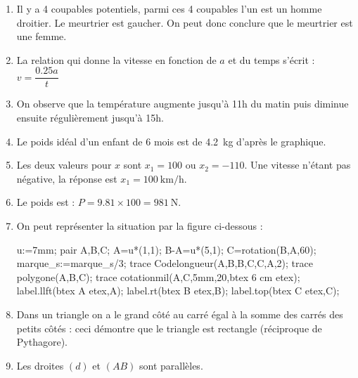 \documentclass[12pt,a4paper,oneside,dvipsnames,table,svgnames,skins,theorems]{report}
\begin{document}
\begin{enumerate}
\item Il y a 4 coupables potentiels, parmi ces 4 coupables l'un est un homme droitier. Le meurtrier est gaucher. On peut donc conclure que le meurtrier est une femme.
\item La relation qui donne la vitesse en fonction de $a$ et du temps s'écrit  : $v=\dfrac{0.25a}{t}$
\item On observe que la température augmente jusqu'à 11h du matin puis diminue ensuite régulièrement jusqu'à 15h.
\item Le poids idéal d'un enfant de 6 mois est de \SI{4.2}{\kilo\gram} d'après le graphique.
\item Les deux valeurs pour $x$ sont $x_1=100$ ou $x_2=-110$. Une vitesse n'étant pas négative, la réponse est $x_1=\SI{100}{\kilo\meter\per\hour}$.
\item Le poids est : $P=9.81 \times 100 = \SI{981}{\newton}$.
\item On peut représenter la situation par la figure ci-dessous : 
\begin{center}
\begin{Geometrie}[TypeTrace="MainLevee"]
u:=7mm;
pair A,B,C;
A=u*(1,1);
B-A=u*(5,1);
C=rotation(B,A,60);
marque_s:=marque_s/3;
trace Codelongueur(A,B,B,C,C,A,2);
trace polygone(A,B,C);
trace cotationmil(A,C,5mm,20,btex 6 cm etex);
label.llft(btex A etex,A);
label.rt(btex B etex,B);
label.top(btex C etex,C);
\end{Geometrie}
\end{center}
\item Dans un triangle on a le grand côté au carré égal à la somme des carrés des petits côtés : ceci démontre que le triangle est rectangle (réciproque de Pythagore).
\item Les droites $(d)$ et $(AB)$ sont parallèles.
\end{enumerate}





\newpage


%
\end{document}
